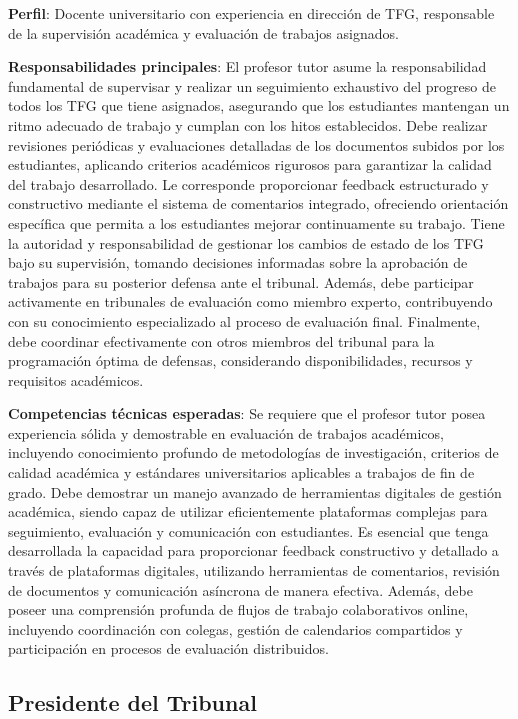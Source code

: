 \documentclass[12pt,a4paper,oneside]{report}
\begin{document}
\textbf{Perfil}: Docente universitario con experiencia en dirección de
TFG, responsable de la supervisión académica y evaluación de trabajos
asignados.

\textbf{Responsabilidades principales}: El profesor tutor asume la responsabilidad fundamental de supervisar y realizar un seguimiento exhaustivo del progreso de todos los TFG que tiene asignados, asegurando que los estudiantes mantengan un ritmo adecuado de trabajo y cumplan con los hitos establecidos. Debe realizar revisiones periódicas y evaluaciones detalladas de los documentos subidos por los estudiantes, aplicando criterios académicos rigurosos para garantizar la calidad del trabajo desarrollado. Le corresponde proporcionar feedback estructurado y constructivo mediante el sistema de comentarios integrado, ofreciendo orientación específica que permita a los estudiantes mejorar continuamente su trabajo. Tiene la autoridad y responsabilidad de gestionar los cambios de estado de los TFG bajo su supervisión, tomando decisiones informadas sobre la aprobación de trabajos para su posterior defensa ante el tribunal. Además, debe participar activamente en tribunales de evaluación como miembro experto, contribuyendo con su conocimiento especializado al proceso de evaluación final. Finalmente, debe coordinar efectivamente con otros miembros del tribunal para la programación óptima de defensas, considerando disponibilidades, recursos y requisitos académicos.

\textbf{Competencias técnicas esperadas}: Se requiere que el profesor tutor posea experiencia sólida y demostrable en evaluación de trabajos académicos, incluyendo conocimiento profundo de metodologías de investigación, criterios de calidad académica y estándares universitarios aplicables a trabajos de fin de grado. Debe demostrar un manejo avanzado de herramientas digitales de gestión académica, siendo capaz de utilizar eficientemente plataformas complejas para seguimiento, evaluación y comunicación con estudiantes. Es esencial que tenga desarrollada la capacidad para proporcionar feedback constructivo y detallado a través de plataformas digitales, utilizando herramientas de comentarios, revisión de documentos y comunicación asíncrona de manera efectiva. Además, debe poseer una comprensión profunda de flujos de trabajo colaborativos online, incluyendo coordinación con colegas, gestión de calendarios compartidos y participación en procesos de evaluación distribuidos.

\subsection{Presidente del Tribunal}\label{presidente-del-tribunal}
\end{document}
